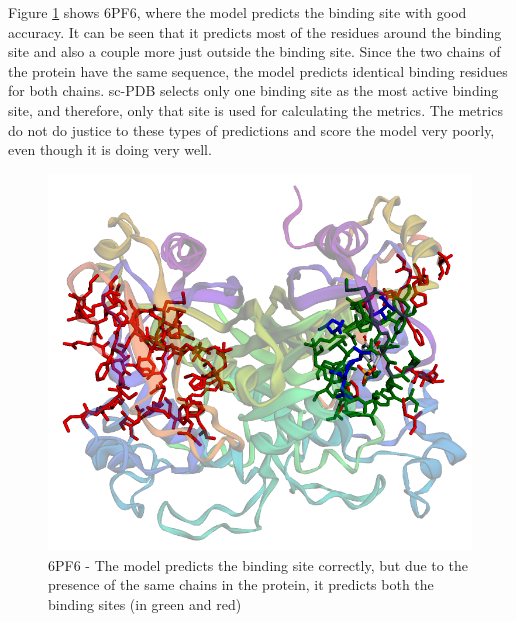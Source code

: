 \documentclass[journal=jcisd8,manuscript=article]{achemso}
\begin{document}
Figure \ref{fig:6pf6} shows 6PF6\cite{czyzyk2019structure}, where the model predicts the binding site with good accuracy. It can be seen that it predicts most of the residues around the binding site and also a couple more just outside the binding site. Since the two chains of the protein have the same sequence, the model predicts identical binding residues for both chains. sc-PDB selects only one binding site as the most active binding site, and therefore, only that site is used for calculating the metrics. The metrics do not do justice to these types of predictions and score the model very poorly, even though it is doing very well.
\begin{figure}
    \centering
    \noindent\includegraphics[scale=0.4]{6pf6.png}
    \caption{\centering 6PF6 - The model predicts the binding site correctly, but due to the presence of the same chains in the protein, it predicts both the binding sites (in green and red)}
    \label{fig:6pf6}
\end{figure}

\newpage
\end{document}
